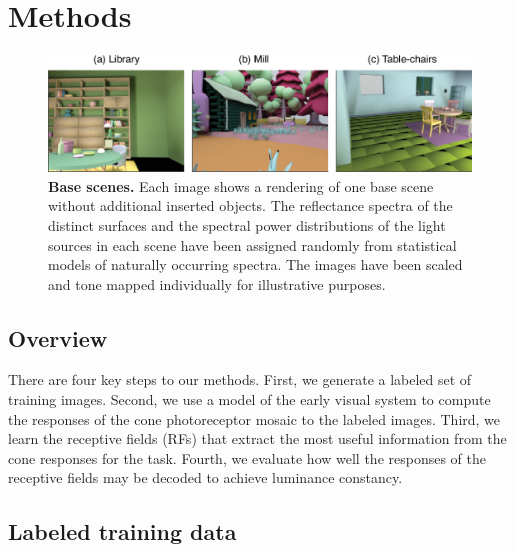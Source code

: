 \documentclass{jov}
\begin{document}
\section*{Methods} \label{Methods}
\begin{figure}
\centering
\includegraphics{Figure2.eps}
    \caption{{\bf Base scenes.} Each image shows a rendering of one base scene without additional inserted objects.  The reflectance spectra of the distinct surfaces and the spectral power distributions of the light sources in each scene have been assigned randomly from statistical models of naturally occurring spectra. The images have been scaled and tone mapped individually for illustrative purposes.}
\label{fig:baseScenes}
\end{figure}

\subsection{Overview}
There are four key steps to our methods.  First, we generate a labeled set of training images.  Second, we use a model of the early visual system to compute the responses of the cone photoreceptor mosaic to the labeled images. Third, we learn the receptive fields (RFs) that extract the most useful information from the cone responses for the task. Fourth, we evaluate how well the responses of the receptive fields may be decoded to achieve luminance constancy.

\subsection{Labeled training data} \label{method:VirtualWorld}
\end{document}
